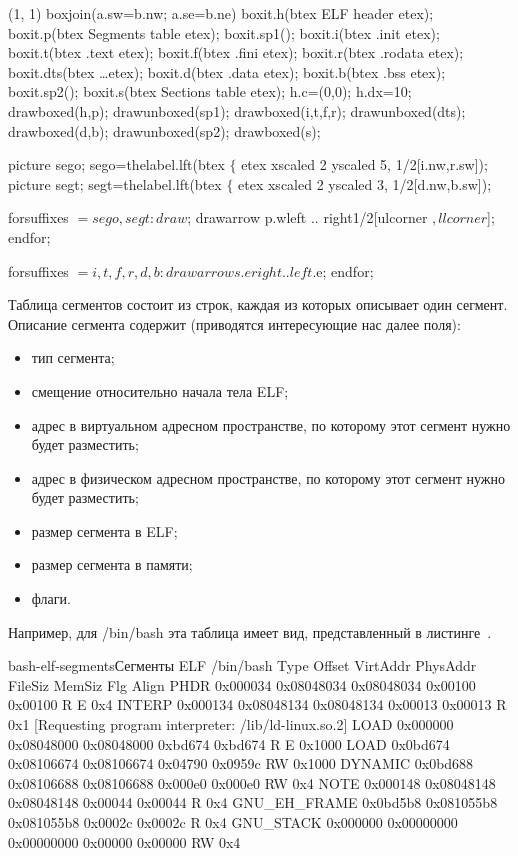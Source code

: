 \begin{empdef}[elf](1, 1)
    boxjoin(a.sw=b.nw; a.se=b.ne)
    boxit.h(btex ELF header etex);
    boxit.p(btex Segments table etex);
    boxit.sp1();
    boxit.i(btex .init etex);
    boxit.t(btex .text etex);
    boxit.f(btex .fini etex);
    boxit.r(btex .rodata etex);
    boxit.dts(btex \dots etex);
    boxit.d(btex .data etex);
    boxit.b(btex .bss etex);
    boxit.sp2();
    boxit.s(btex Sections table etex);
    h.c=(0,0);
    h.dx=10;
    drawboxed(h,p);
    drawunboxed(sp1);
    drawboxed(i,t,f,r);
    drawunboxed(dts);
    drawboxed(d,b);
    drawunboxed(sp2);
    drawboxed(s);

    picture sego; sego=thelabel.lft(btex $\lbrace$ etex xscaled 2 yscaled 5, 1/2[i.nw,r.sw]);
    picture segt; segt=thelabel.lft(btex $\lbrace$ etex xscaled 2 yscaled 3, 1/2[d.nw,b.sw]);

    forsuffixes $=sego,segt:
        draw $;
        drawarrow p.w{left} .. {right}1/2[ulcorner $, llcorner $];
    endfor;

    forsuffixes $=i,t,f,r,d,b:
        drawarrow s.e{right} .. {left}$.e;
    endfor;
\end{empdef}


Таблица сегментов состоит из строк, каждая из которых описывает один сегмент.
Описание сегмента содержит (приводятся интересующие нас далее поля):
\begin{itemize}
    \item тип сегмента;
    \item смещение относительно начала тела ELF;
    \item адрес в виртуальном адресном пространстве, по которому этот сегмент нужно будет разместить;
    \item адрес в физическом адресном пространстве, по которому этот сегмент нужно будет разместить;
    \item размер сегмента в ELF;
    \item размер сегмента в памяти;
    \item флаги.
\end{itemize}

Например, для /bin/bash эта таблица имеет вид, представленный в листинге~.
\begin{stdout}{bash-elf-segments}{Сегменты ELF /bin/bash}
Type           Offset   VirtAddr   PhysAddr   FileSiz MemSiz  Flg Align
PHDR           0x000034 0x08048034 0x08048034 0x00100 0x00100 R E 0x4
INTERP         0x000134 0x08048134 0x08048134 0x00013 0x00013 R   0x1
    [Requesting program interpreter: /lib/ld-linux.so.2]
LOAD           0x000000 0x08048000 0x08048000 0xbd674 0xbd674 R E 0x1000
LOAD           0x0bd674 0x08106674 0x08106674 0x04790 0x0959c RW  0x1000
DYNAMIC        0x0bd688 0x08106688 0x08106688 0x000e0 0x000e0 RW  0x4
NOTE           0x000148 0x08048148 0x08048148 0x00044 0x00044 R   0x4
GNU_EH_FRAME   0x0bd5b8 0x081055b8 0x081055b8 0x0002c 0x0002c R   0x4
GNU_STACK      0x000000 0x00000000 0x00000000 0x00000 0x00000 RW  0x4
\end{stdout}

